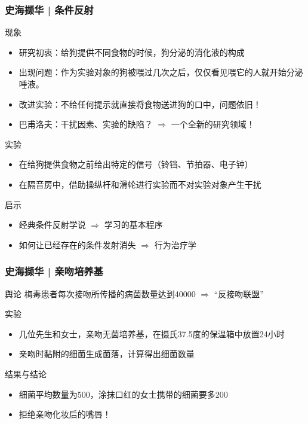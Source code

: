 \begin{frame}
  \frametitle{史海撷华 | 条件反射}
  \begin{block}{现象}
    \begin{itemize}
      \item 研究初衷：给狗提供不同食物的时候，狗分泌的消化液的构成
      \item 出现问题：作为实验对象的狗被喂过几次之后，仅仅看见喂它的人就开始分泌唾液。
      \item 改进实验：不给任何提示就直接将食物送进狗的口中，问题依旧！
      \item 巴甫洛夫：干扰因素、实验的缺陷？ $\Rightarrow$ 一个全新的研究领域！
    \end{itemize}
  \end{block}
  \vspace{-0.5em}
  \pause
  \begin{block}{实验}
    \begin{itemize}
      \item 在给狗提供食物之前给出特定的信号（铃铛、节拍器、电子钟）
      \item 在隔音房中，借助操纵杆和滑轮进行实验而不对实验对象产生干扰
    \end{itemize}
  \end{block}
  \vspace{-0.5em}
  \pause
  \begin{block}{启示}
    \begin{itemize}
      \item 经典条件反射学说 $\Rightarrow$ 学习的基本程序
      \item 如何让已经存在的条件发射消失 $\Rightarrow$ 行为治疗学
    \end{itemize}
  \end{block}
\end{frame}

\begin{frame}
  \frametitle{史海撷华 | 亲吻培养基}
  \begin{block}{舆论}
    梅毒患者每次接吻所传播的病菌数量达到40000 $\Rightarrow$ “反接吻联盟”
  \end{block}
  \pause
  \begin{block}{实验}
    \begin{itemize}
      \item 几位先生和女士，亲吻无菌培养基，在摄氏37.5度的保温箱中放置24小时
      \item 亲吻时黏附的细菌生成菌落，计算得出细菌数量
    \end{itemize}
  \end{block}
  \pause
  \begin{block}{结果与结论}
    \begin{itemize}
      \item 细菌平均数量为500，涂抹口红的女士携带的细菌要多200
      \item 拒绝亲吻化妆后的嘴唇！
    \end{itemize}
  \end{block}
\end{frame}

